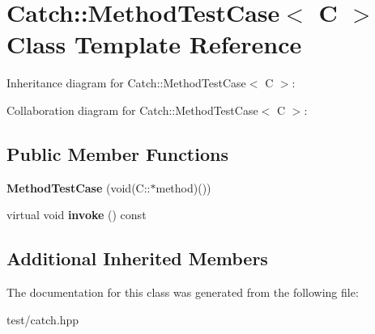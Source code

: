 \hypertarget{classCatch_1_1MethodTestCase}{}\section{Catch\+:\+:Method\+Test\+Case$<$ C $>$ Class Template Reference}
\label{classCatch_1_1MethodTestCase}


Inheritance diagram for Catch\+:\+:Method\+Test\+Case$<$ C $>$\+:


Collaboration diagram for Catch\+:\+:Method\+Test\+Case$<$ C $>$\+:
\subsection*{Public Member Functions}
\begin{DoxyCompactItemize}
\item 
{\bfseries Method\+Test\+Case} (void(C\+::$\ast$method)())\hypertarget{classCatch_1_1MethodTestCase_a7b043b85dae371358255dd9dc6582e7b}{}\label{classCatch_1_1MethodTestCase_a7b043b85dae371358255dd9dc6582e7b}

\item 
virtual void {\bfseries invoke} () const \hypertarget{classCatch_1_1MethodTestCase_a39cc4b760dd71adc3f7550bc1e7eb697}{}\label{classCatch_1_1MethodTestCase_a39cc4b760dd71adc3f7550bc1e7eb697}

\end{DoxyCompactItemize}
\subsection*{Additional Inherited Members}


The documentation for this class was generated from the following file\+:\begin{DoxyCompactItemize}
\item 
test/catch.\+hpp\end{DoxyCompactItemize}

